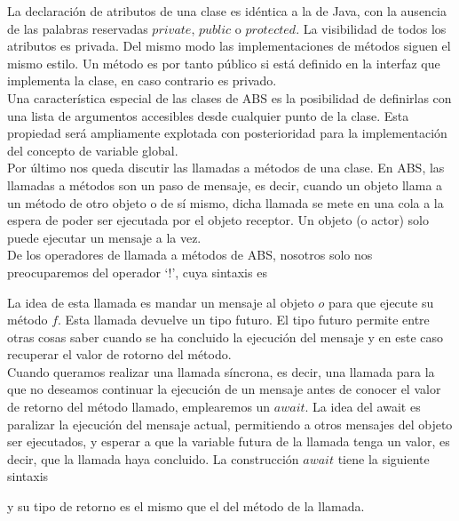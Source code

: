 

La declaración de atributos de una clase es idéntica a la de Java, con la ausencia de las palabras reservadas $private$, $public$ o $protected$. La visibilidad de todos los atributos es privada. Del mismo modo las implementaciones de métodos siguen el mismo estilo. Un método es por tanto público si está definido en la interfaz que implementa la clase, en caso contrario es privado.\\

Una característica especial de las clases de ABS es la posibilidad de definirlas con una lista de argumentos accesibles desde cualquier punto de la clase. Esta propiedad será ampliamente explotada con posterioridad para la implementación del concepto de variable global.\\

Por último nos queda discutir las llamadas a métodos de una clase. En ABS, las llamadas a métodos son un paso de mensaje, es decir, cuando un objeto llama a un método de otro objeto o de sí mismo, dicha llamada se mete en una cola a la espera de poder ser ejecutada por el objeto receptor. Un objeto (o actor) solo puede ejecutar un mensaje a la vez.\\

De los operadores de llamada a métodos de ABS, nosotros solo nos preocuparemos del operador `$!$', cuya sintaxis es



La idea de esta llamada es mandar un mensaje al objeto $o$ para que ejecute su método $f$. Esta llamada devuelve un tipo futuro. El tipo futuro permite entre otras cosas saber cuando se ha concluido la ejecución del mensaje y en este caso recuperar el valor de rotorno del método.\\

Cuando queramos realizar una llamada síncrona, es decir, una llamada para la que no deseamos continuar la ejecución de un mensaje antes de conocer el valor de retorno del método llamado, emplearemos un $await$. La idea del await es paralizar la ejecución del mensaje actual, permitiendo a otros mensajes del objeto ser ejecutados, y esperar a que la variable futura de la llamada tenga un valor, es decir, que la llamada haya concluido. La construcción $await$ tiene la siguiente sintaxis



y su tipo de retorno es el mismo que el del método de la llamada.\\

